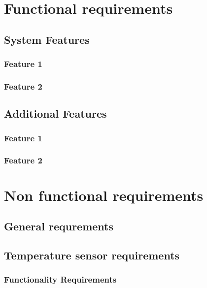 
\section{Functional requirements}

\subsection{System Features}

\subsubsection{Feature 1}

\subsubsection{Feature 2}

\subsection{Additional Features}

\subsubsection{Feature 1}

\subsubsection{Feature 2}

\section{Non functional requirements}

\subsection{General requrements}

\subsection{Temperature sensor requirements}

\subsubsection{Functionality Requirements}


